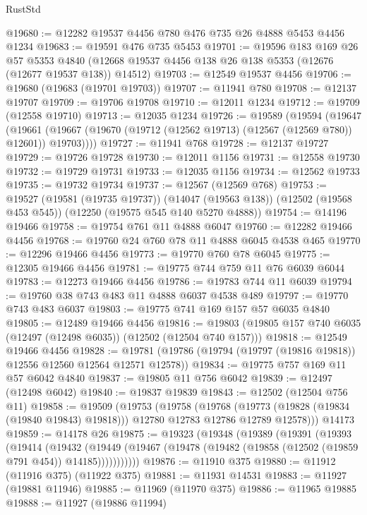 \begin{lexlean}{RustStd}
\begin{coremodule}
@19680 := @12282 @19537 @4456 @780 @476 @735 @26 @4888 @5453 @4456 @1234
@19683 := @19591 @476 @735 @5453
@19701 := @19596
    @183
    @169
    @26
    @57
    @5353
    @4840
    (@12668 @19537 @4456 @138 @26 @138 @5353 (@12676 (@12677 @19537 @138)) @14512)
@19703 := @12549 @19537 @4456
@19706 := @19680 (@19683 (@19701 @19703))
@19707 := @11941 @780
@19708 := @12137 @19707
@19709 := @19706 @19708
@19710 := @12011 @1234
@19712 := @19709 (@12558 @19710)
@19713 := @12035 @1234
@19726 := @19589
    (@19594
      (@19647
        (@19661 (@19667 (@19670 (@19712 (@12562 @19713) (@12567 (@12569 @780)) @12601)) @19703))))
@19727 := @11941 @768
@19728 := @12137 @19727
@19729 := @19726 @19728
@19730 := @12011 @1156
@19731 := @12558 @19730
@19732 := @19729 @19731
@19733 := @12035 @1156
@19734 := @12562 @19733
@19735 := @19732 @19734
@19737 := @12567 (@12569 @768)
@19753 := @19527
    (@19581 (@19735 @19737))
    (@14047 (@19563 @138))
    (@12502 (@19568 @453 @545))
    (@12250 (@19575 @545 @140 @5270 @4888))
@19754 := @14196 @19466
@19758 := @19754 @761 @11 @4888 @6047
@19760 := @12282 @19466 @4456
@19768 := @19760 @24 @760 @78 @11 @4888 @6045 @4538 @465
@19770 := @12296 @19466 @4456
@19773 := @19770 @760 @78 @6045
@19775 := @12305 @19466 @4456
@19781 := @19775 @744 @759 @11 @76 @6039 @6044
@19783 := @12273 @19466 @4456
@19786 := @19783 @744 @11 @6039
@19794 := @19760 @38 @743 @483 @11 @4888 @6037 @4538 @489
@19797 := @19770 @743 @483 @6037
@19803 := @19775 @741 @169 @157 @57 @6035 @4840
@19805 := @12489 @19466 @4456
@19816 := @19803 (@19805 @157 @740 @6035 (@12497 (@12498 @6035)) (@12502 (@12504 @740 @157)))
@19818 := @12549 @19466 @4456
@19828 := @19781 (@19786 (@19794 (@19797 (@19816 @19818)) @12556 @12560 @12564 @12571 @12578))
@19834 := @19775 @757 @169 @11 @57 @6042 @4840
@19837 := @19805 @11 @756 @6042
@19839 := @12497 (@12498 @6042)
@19840 := @19837 @19839
@19843 := @12502 (@12504 @756 @11)
@19858 := @19509
    (@19753
      (@19758
        (@19768
          (@19773 (@19828 (@19834 (@19840 @19843) @19818)))
          @12780
          @12783
          @12786
          @12789
          @12578)))
    @14173
@19859 := @14178 @26
@19875 := @19323
    (@19348
      (@19389
        (@19391
          (@19393
            (@19414
              (@19432
                (@19449
                  (@19467 (@19478 (@19482 (@19858 (@12502 (@19859 @791 @454)) @14185)))))))))))
@19876 := @11910 @375
@19880 := @11912 (@11916 @375) (@11922 @375)
@19881 := @11931 @14531
@19883 := @11927 (@19881 @11946)
@19885 := @11969 (@11970 @375)
@19886 := @11965 @19885
@19888 := @11927 (@19886 @11994)

\end{coremodule}
\end{lexlean}
